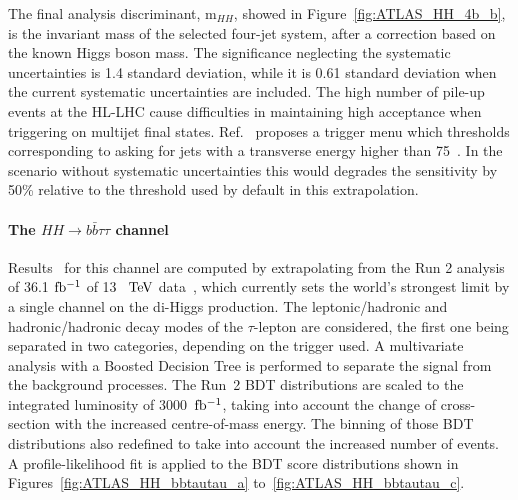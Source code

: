 The final analysis discriminant, m$_{HH}$, showed in Figure~\ref{fig:ATLAS_HH_4b_b}, is the invariant mass of the selected four-jet system, after a correction based on the known Higgs boson mass. The significance neglecting the systematic uncertainties is 1.4 standard deviation, while it is 0.61 standard deviation when the current systematic uncertainties are included. 
The high number of pile-up events at the HL-LHC cause difficulties in maintaining high acceptance when triggering on multijet final states. Ref.~\cite{Collaboration:2285584} proposes a trigger menu which thresholds corresponding to asking for jets with a transverse energy higher than 75~\UGeV. In the scenario without systematic uncertainties this would degrades the sensitivity by 50\% relative to the threshold used by default in this extrapolation.


%
\paragraph{The $HH \rightarrow b\bar{b}\tau\tau$ channel}

Results~\cite{ATLASHHPUBnote} for this channel are computed by extrapolating from the Run 2 analysis of 36.1 $\mbox{fb$^{-1}$}$ of 13~$~\text{TeV}$ data~\cite{ATLASrun2HHbbtautau}, which currently sets the world's strongest limit by a single channel on the di-Higgs production. 
The leptonic/hadronic and hadronic/hadronic decay modes of the $\tau$-lepton are considered, the first one being separated in two categories, depending on the trigger used. A multivariate analysis with a Boosted Decision Tree is performed to separate the signal from the background processes. The Run~2 BDT distributions are scaled to the integrated luminosity of 3000~$\mbox{fb$^{-1}$}$, taking into account the change of cross-section with the increased centre-of-mass energy. The binning of those BDT distributions also redefined to take into account the increased number of events.
A profile-likelihood fit is applied to the BDT score distributions shown in Figures~\ref{fig:ATLAS_HH_bbtautau_a} to~\ref{fig:ATLAS_HH_bbtautau_c}. 


